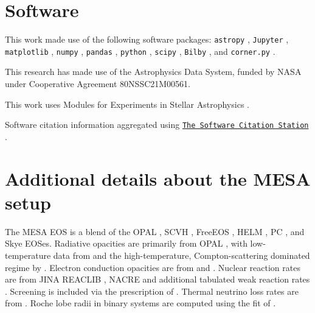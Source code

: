 \documentclass[linenumbers,trackchanges,twocolumn]{aastex701}
\begin{document}
\section{Software}

This work made use of the following software packages: \texttt{astropy} \citep{astropy:2013, astropy:2018, astropy:2022}, \texttt{Jupyter} \citep{2007CSE.....9c..21P, kluyver2016jupyter}, \texttt{matplotlib} \citep{Hunter:2007}, \texttt{numpy} \citep{numpy}, \texttt{pandas} \citep{mckinney-proc-scipy-2010, pandas_17229934}, \texttt{python} \citep{python}, \texttt{scipy} \citep{2020SciPy-NMeth, scipy_17101542}, \texttt{Bilby} \citep{bilby_paper, bilby_paper_2, Bilby_17314023}, and \texttt{corner.py} \citep{corner-Foreman-Mackey-2016, corner.py_14209694}.

This research has made use of the Astrophysics Data System, funded by NASA under Cooperative Agreement 80NSSC21M00561.

This work uses Modules for Experiments in Stellar Astrophysics \citep[MESA][]{2011ApJS..192....3P,2013ApJS..208....4P,2015ApJS..220...15P,2018ApJS..234...34P,2019ApJS..243...10P,2023ApJS..265...15J}.

Software citation information aggregated using \texttt{\href{https://www.tomwagg.com/software-citation-station/}{The Software Citation Station}} \citep{software-citation-station-paper, software-citation-station-zenodo}.

\appendix

\section{Additional details about the MESA setup}

The MESA EOS is a blend of the OPAL \citep{Rogers2002}, SCVH \citep{Saumon1995}, FreeEOS \citep{Irwin2004}, HELM \citep{Timmes2000}, PC \citep{Potekhin2010}, and Skye \citep{Jermyn2021} EOSes. Radiative opacities are primarily from OPAL \citep{Iglesias1993, Iglesias1996}, with low-temperature data from \citet{Ferguson2005} and the high-temperature, Compton-scattering dominated regime by \citet{Poutanen2017}. Electron conduction opacities are from \citet{Cassisi2007} and \citet{Blouin2020}. Nuclear reaction rates are from JINA REACLIB \citep{Cyburt2010}, NACRE \citep{Angulo1999} and additional tabulated weak reaction rates \citet{Fuller1985, Oda1994, Langanke2000}. Screening is included via the prescription of \citet{Chugunov2007}. Thermal neutrino loss rates are from \citet{Itoh1996}. Roche lobe radii in binary systems are computed using the fit of \citet{1983ApJ...268..368E}.
\end{document}
